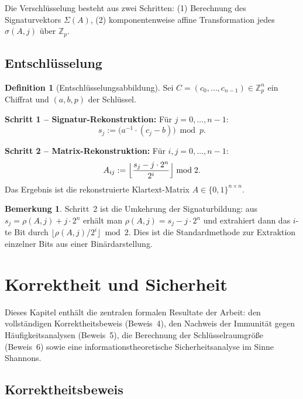 ﻿\documentclass[a4paper,12pt]{scrreprt}
\theoremstyle{definition}
\newtheorem{definition}{Definition}[section]
\newtheorem{bemerkung}{Bemerkung}[section]
\begin{document}
Die Verschlüsselung besteht aus zwei Schritten: (1) Berechnung des Signaturvektors $\Sigma(A)$, (2) komponentenweise affine Transformation jedes $\sigma(A,j)$ über $\mathbb{Z}_p$.

\subsection{Entschlüsselung}

\begin{definition}[Entschlüsselungsabbildung]
	\label{def:dec}
	Sei $C = (c_0, \ldots, c_{n-1}) \in \mathbb{Z}_p^n$ ein Chiffrat und $(a, b, p)$ der Schlüssel.
	
	\textbf{Schritt 1 -- Signatur-Rekonstruktion:} Für $j = 0, \ldots, n-1$:
	\[
	s_j := \bigl(a^{-1} \cdot (c_j - b)\bigr) \bmod p.
	\]
	
	\textbf{Schritt 2 -- Matrix-Rekonstruktion:} Für $i, j = 0, \ldots, n-1$:
	\[
	A_{ij} := \Bigl\lfloor \frac{s_j - j \cdot 2^n}{2^i} \Bigr\rfloor \bmod 2.
	\]
	Das Ergebnis ist die rekonstruierte Klartext-Matrix $A \in \{0,1\}^{n \times n}$.
\end{definition}

\begin{bemerkung}
	Schritt~2 ist die Umkehrung der Signaturbildung: aus $s_j = \rho(A,j) + j \cdot 2^n$ erhält man $\rho(A,j) = s_j - j \cdot 2^n$ und extrahiert dann das $i$-te Bit durch $\lfloor \rho(A,j) / 2^i \rfloor \bmod 2$. Dies ist die Standardmethode zur Extraktion einzelner Bits aus einer Binärdarstellung.
\end{bemerkung}

\section{Korrektheit und Sicherheit}

Dieses Kapitel enthält die zentralen formalen Resultate der Arbeit: den vollständigen Korrektheitsbeweis (Beweis~4), den Nachweis der Immunität gegen Häufigkeitsanalysen (Beweis~5), die Berechnung der Schlüsselraumgröße (Beweis~6) sowie eine informationstheoretische Sicherheitsanalyse im Sinne Shannons.

\subsection{Korrektheitsbeweis}
\end{document}
